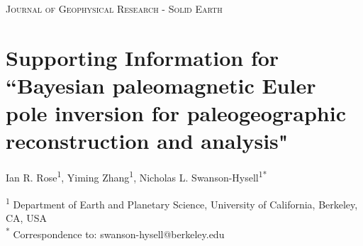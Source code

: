 \documentclass[11pt,letterpaper]{article}
\begin{document}
\begin{center}
\textsc{Journal of Geophysical Research - Solid Earth}
\end{center}

\renewcommand{\thefigure}{S\arabic{figure}}
\renewcommand{\thetable}{S\arabic{table}}
\section*{Supporting Information for ``Bayesian paleomagnetic Euler pole inversion for paleogeographic reconstruction and analysis"}

Ian R. Rose\textsuperscript{1},
Yiming Zhang\textsuperscript{1},
Nicholas L. Swanson-Hysell\textsuperscript{1}\textsuperscript{*}

\begin{flushleft}
\bigskip
\textsuperscript{1} Department of Earth and Planetary Science, University of California, Berkeley, CA, USA\\
\textsuperscript{*} Correspondence to: swanson-hysell@berkeley.edu \\
\end{flushleft}



\listoffigures
\end{document}
